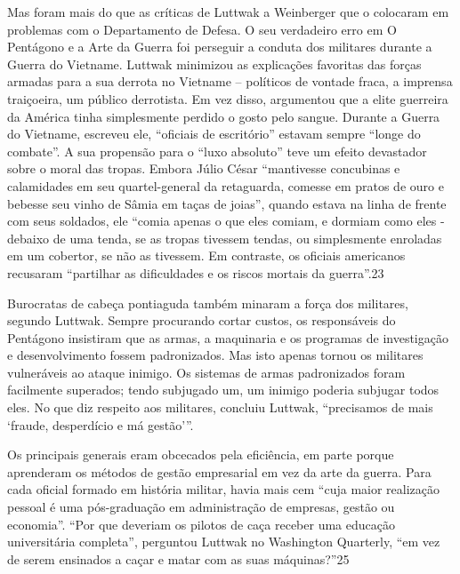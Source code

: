  \par 
Mas foram mais do que as críticas de Luttwak a Weinberger que o colocaram em problemas com o Departamento de Defesa. O seu verdadeiro erro em O Pentágono e a Arte da Guerra foi perseguir a conduta dos militares durante a Guerra do Vietname. Luttwak minimizou as explicações favoritas das forças armadas para a sua derrota no Vietname – políticos de vontade fraca, a imprensa traiçoeira, um público derrotista. Em vez disso, argumentou que a elite guerreira da América tinha simplesmente perdido o gosto pelo sangue. Durante a Guerra do Vietname, escreveu ele, “oficiais de escritório” estavam sempre “longe do combate”. A sua propensão para o “luxo absoluto” teve um efeito devastador sobre o moral das tropas. Embora Júlio César “mantivesse concubinas e calamidades em seu quartel-general da retaguarda, comesse em pratos de ouro e bebesse seu vinho de Sâmia em taças de joias”, quando estava na linha de frente com seus soldados, ele “comia apenas o que eles comiam, e dormiam como eles - debaixo de uma tenda, se as tropas tivessem tendas, ou simplesmente enroladas em um cobertor, se não as tivessem. Em contraste, os oficiais americanos recusaram “partilhar as dificuldades e os riscos mortais da guerra”.{\color{blue}23}
 \par 
Burocratas de cabeça pontiaguda também minaram a força dos militares, segundo Luttwak. Sempre procurando cortar custos, os responsáveis ​​do Pentágono insistiram que as armas, a maquinaria e os programas de investigação e desenvolvimento fossem padronizados. Mas isto apenas tornou os militares vulneráveis ​​ao ataque inimigo. Os sistemas de armas padronizados foram facilmente superados; tendo subjugado um, um inimigo poderia subjugar todos eles. No que diz respeito aos militares, concluiu Luttwak, “precisamos de mais ‘fraude, desperdício e má gestão’”.
 \par 
Os principais generais eram obcecados pela eficiência, em parte porque aprenderam os métodos de gestão empresarial em vez da arte da guerra. Para cada oficial formado em história militar, havia mais cem “cuja maior realização pessoal é uma pós-graduação em administração de empresas, gestão ou economia”. “Por que deveriam os pilotos de caça receber uma educação universitária completa”, perguntou Luttwak no Washington Quarterly, “em vez de serem ensinados a caçar e matar com as suas máquinas?”{\color{blue}25}
 \par 
